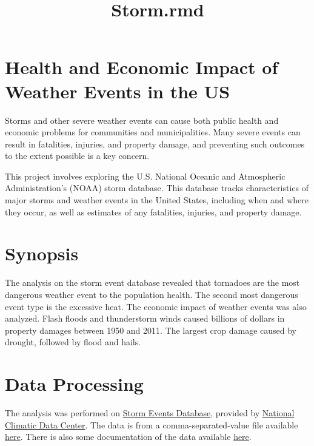 \documentclass[]{article}
\title{Storm.rmd}
\author{}
\date{}
\begin{document}
\maketitle

\section{Health and Economic Impact of Weather Events in the
US}\label{health-and-economic-impact-of-weather-events-in-the-us}

Storms and other severe weather events can cause both public health and
economic problems for communities and municipalities. Many severe events
can result in fatalities, injuries, and property damage, and preventing
such outcomes to the extent possible is a key concern.

This project involves exploring the U.S. National Oceanic and
Atmospheric Administration's (NOAA) storm database. This database tracks
characteristics of major storms and weather events in the United States,
including when and where they occur, as well as estimates of any
fatalities, injuries, and property damage.

\section{Synopsis}\label{synopsis}

The analysis on the storm event database revealed that tornadoes are the
most dangerous weather event to the population health. The second most
dangerous event type is the excessive heat. The economic impact of
weather events was also analyzed. Flash floods and thunderstorm winds
caused billions of dollars in property damages between 1950 and 2011.
The largest crop damage caused by drought, followed by flood and hails.

\section{Data Processing}\label{data-processing}

The analysis was performed on
\href{http://www.ncdc.noaa.gov/stormevents/ftp.jsp}{Storm Events
Database}, provided by \href{http://www.ncdc.noaa.gov/}{National
Climatic Data Center}. The data is from a comma-separated-value file
available
\href{https://d396qusza40orc.cloudfront.net/repdata\%2Fdata\%2FStormData.csv.bz2}{here}.
There is also some documentation of the data available
\href{https://d396qusza40orc.cloudfront.net/repdata\%2Fpeer2_doc\%2Fpd01016005curr.pdf}{here}.
\end{document}
